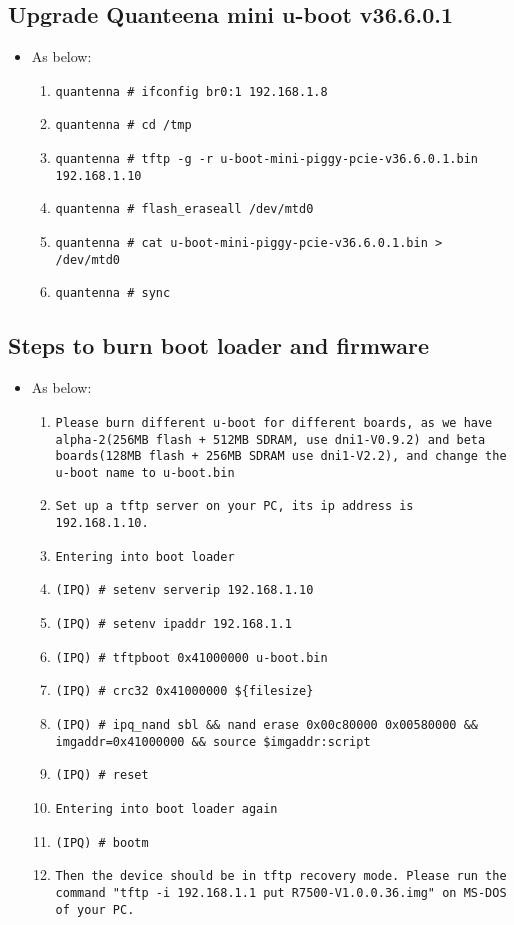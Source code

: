 \documentclass[12pt]{report}
\begin{document}
    \subsection{Upgrade Quanteena mini u-boot v36.6.0.1}
    \begin{itemize}
    \item As below:
    	\begin{enumerate}
		\item \texttt{quantenna \# ifconfig br0:1 192.168.1.8}
		\item \texttt{quantenna \# cd /tmp}
		\item \texttt{quantenna \# tftp -g -r u-boot-mini-piggy-pcie-v36.6.0.1.bin 192.168.1.10}
		\item \texttt{quantenna \# flash\_eraseall /dev/mtd0}
		\item \texttt{quantenna \# cat u-boot-mini-piggy-pcie-v36.6.0.1.bin > /dev/mtd0}
		\item \texttt{quantenna \# sync}
    	\end{enumerate}
    \end{itemize}

    \subsection{Steps to burn boot loader and firmware}
    \begin{itemize}
    \item As below:
            \begin{enumerate}
	    	\item \texttt{Please burn different u-boot for different boards, as we have alpha-2(256MB flash + 512MB SDRAM, use dni1-V0.9.2) and beta boards(128MB flash + 256MB SDRAM use dni1-V2.2), and change the u-boot name to u-boot.bin}
		\item \texttt{Set up a tftp server on your PC, its ip address is 192.168.1.10.}
		\item \texttt{Entering into boot loader}
		\item \texttt{(IPQ) \# setenv serverip 192.168.1.10}
		\item \texttt{(IPQ) \# setenv ipaddr 192.168.1.1}
		\item \texttt{(IPQ) \# tftpboot 0x41000000 u-boot.bin}
		\item \texttt{(IPQ) \# crc32 0x41000000 \$\{filesize\}}
		\item \texttt{(IPQ) \# ipq\_nand sbl \&\& nand erase 0x00c80000 0x00580000 \&\& imgaddr=0x41000000 \&\& source \$imgaddr:script}
		\item \texttt{(IPQ) \# reset}
		\item \texttt{Entering into boot loader again}
		\item \texttt{(IPQ) \# bootm}
		\item \texttt{Then the device should be in tftp recovery mode. Please run the command "tftp -i 192.168.1.1 put R7500-V1.0.0.36.img" on MS-DOS of your PC.}
            \end{enumerate}
    \end{itemize}
\end{document}
